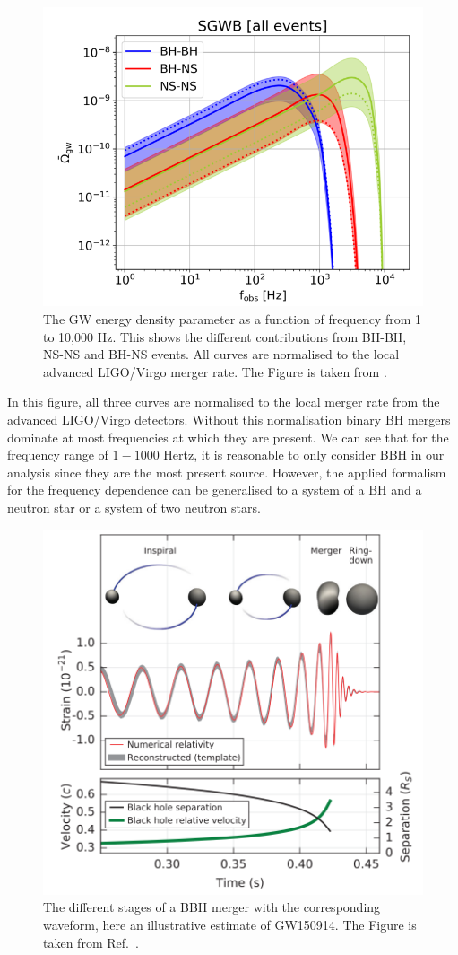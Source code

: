 \begin{figure}[h]
    \centering
    \includegraphics[width=0.7\linewidth]{Images/Capurri_GW_Background_monopole_sources.png}
    \caption[The GW energy density parameter as a function of frequency from 1 to 10,000 Hz.]{The GW energy density parameter as a function of frequency from 1 to 10,000 Hz. This shows the different contributions from BH-BH, NS-NS and BH-NS events. All curves are normalised to the local advanced LIGO/Virgo merger rate. The Figure is taken from \cite{capurri_intensity_2021}.} 
    \label{BG_sources}
\end{figure} 

In this figure, all three curves are normalised to the local merger rate from the advanced LIGO/Virgo detectors. Without this normalisation binary BH mergers dominate at most frequencies at which they are present. We can see that for the frequency range of $1-1000$ Hertz, it is reasonable to only consider BBH in our analysis since they are the most present source. However, the applied formalism for the frequency dependence can be generalised to a system of a BH and a neutron star or a system of two neutron stars.

\begin{figure}[h]
    \centering
    \includegraphics[width=0.7\linewidth]{Images/waveform_abbott_complete.png}
    \caption[The different stages of a BBH merger with the corresponding waveform.]{The different stages of a BBH merger with the corresponding waveform, here an illustrative estimate of GW150914. The Figure is taken from Ref.\ \cite{abbott_observation_2016}.}
    \label{GW_waveform}
\end{figure} 

